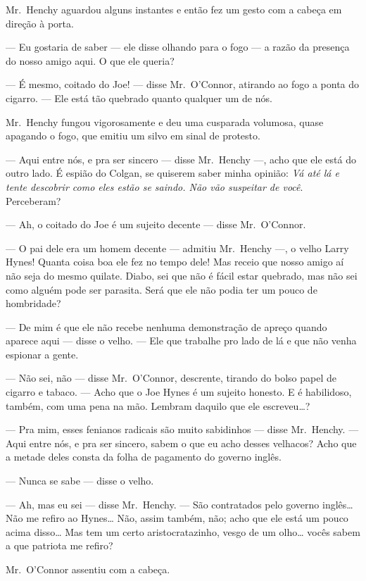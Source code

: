 Mr.~Henchy aguardou alguns instantes e então fez um gesto com a cabeça em
direção à porta.

--- Eu gostaria de saber --- ele disse olhando para o fogo --- a razão da
presença do nosso amigo aqui.  O que ele queria?

--- É mesmo, coitado do Joe! --- disse Mr.~O’Connor, atirando ao fogo a ponta
do cigarro.  --- Ele está tão quebrado quanto qualquer um de nós.

Mr.~Henchy fungou vigorosamente e deu uma cusparada volumosa, quase apagando o
fogo, que emitiu um silvo em sinal de protesto.

--- Aqui entre nós, e pra ser sincero --- disse Mr.~Henchy ---, acho que ele
está do outro lado.  É espião do Colgan, se quiserem saber minha opinião:
\textit{Vá até lá e tente descobrir como eles estão se saindo.  Não
vão suspeitar de você}.  Perceberam?

--- Ah, o coitado do Joe é um sujeito decente --- disse Mr.~O’Connor.

--- O pai dele era um homem decente --- admitiu Mr.~Henchy ---, o velho Larry
Hynes! Quanta coisa boa ele fez no tempo dele!  Mas receio que nosso amigo aí
não seja do mesmo quilate.  Diabo, sei que não é fácil estar quebrado, mas não
sei como alguém pode ser parasita.  Será que ele não podia ter um pouco de
hombridade?

--- De mim é que ele não recebe nenhuma demonstração de apreço quando aparece
aqui --- disse o velho.  --- Ele que trabalhe pro lado de lá e que não venha
espionar a gente.

--- Não sei, não --- disse Mr.~O’Connor, descrente, tirando do bolso papel de
cigarro e tabaco.  --- Acho que o Joe Hynes é um sujeito honesto.  E é
habilidoso, também, com uma pena na mão.  Lembram daquilo que ele
escreveu\ldots{}?

--- Pra mim, esses fenianos radicais são muito sabidinhos --- disse Mr.~Henchy.  
--- Aqui entre nós, e pra ser sincero, sabem o que eu acho desses
velhacos?  Acho que a metade deles consta da folha de pagamento do governo
inglês.

--- Nunca se sabe --- disse o velho.

--- Ah, mas eu sei --- disse Mr.~Henchy.  --- São contratados pelo governo
inglês\ldots{}  Não me refiro ao Hynes\ldots{}  Não, assim também, não; acho
que ele está um pouco acima disso\ldots{} Mas tem um certo aristocratazinho,
vesgo de um olho\ldots{} vocês sabem a que patriota me refiro?

Mr.~O’Connor assentiu com a cabeça.

